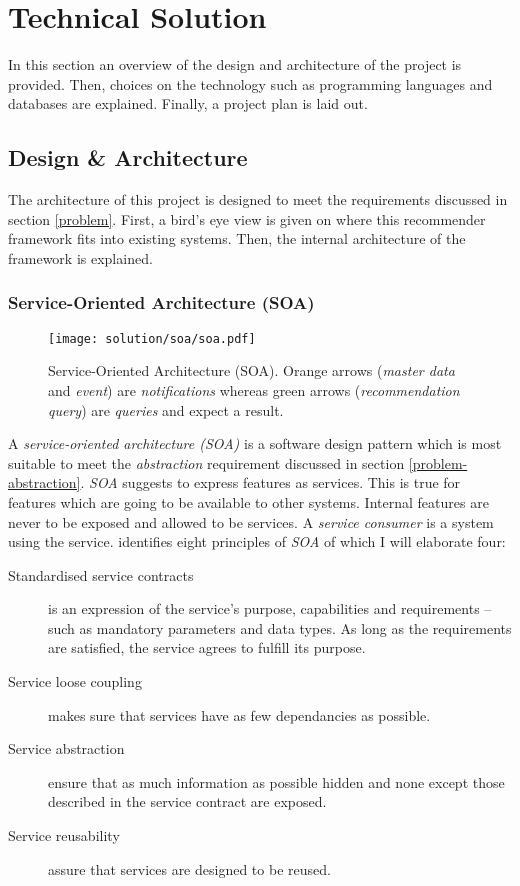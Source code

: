 \chapter{Technical Solution}

In this section an overview of the design and architecture of the project is provided. Then, choices on the technology such as programming languages and databases are explained. Finally, a project plan is laid out.



\section{Design \& Architecture}

The architecture of this project is designed to meet the requirements discussed in section \ref{problem}. First, a bird's eye view is given on where this recommender framework fits into existing systems. Then, the internal architecture of the framework is explained.

\subsection{Service-Oriented Architecture (SOA)}
\label{sol-design-soa}

\begin{figure}[ht]
    \texttt{[image: solution/soa/soa.pdf]}
    \caption[Service-Oriented Architecture (SOA)]{Service-Oriented Architecture (SOA). Orange arrows (\emph{master data} and \emph{event}) are \emph{notifications} whereas green arrows (\emph{recommendation query}) are \emph{queries} and expect a result.}
    \label{fig:soa}
\end{figure}

A \emph{service-oriented architecture (SOA)} is a software design pattern which is most suitable to meet the \emph{abstraction} requirement discussed in section \ref{problem-abstraction}. \emph{SOA} suggests to express features as services. This is true for features which are going to be available to other systems. Internal features are never to be exposed and allowed to be services. A \emph{service consumer} is a system using the service. \cite{erl08} identifies eight principles of \emph{SOA} of which I will elaborate four:

\begin{description}
    \item[Standardised service contracts] is an expression of the service's purpose, capabilities and requirements -- such as mandatory parameters and data types. As long as the requirements are satisfied, the service agrees to fulfill its purpose.
    \item[Service loose coupling] makes sure that services have as few dependancies as possible.
    \item[Service abstraction] ensure that as much information as possible hidden and none except those described in the service contract are exposed.
    \item[Service reusability] assure that services are designed to be reused.
\end{description}

